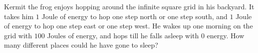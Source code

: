 Kermit the frog enjoys hopping around the inﬁnite square grid in his backyard. It takes him $ 1$ Joule of energy to hop one step north or one step south, and $ 1$ Joule of energy to hop one step east or one step west. He wakes up one morning on the grid with $ 100$ Joules of energy, and hops till he falls asleep with $ 0$ energy. How many different places could he have gone to sleep?